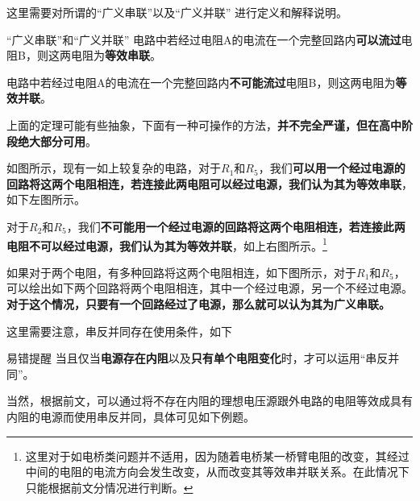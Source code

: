这里需要对所谓的“广义串联”以及“广义并联” 进行定义和解释说明。

\begin{defi}[label=gycbl]{“广义串联”和“广义并联”}{}
电路中若经过电阻A的电流在一个完整回路内\textbf{可以流过}电阻B，则这两电阻为\textbf{等效串联}。

电路中若经过电阻A的电流在一个完整回路内\textbf{不可能流过}电阻B，则这两电阻为\textbf{等效并联}。
\end{defi}

上面的定理可能有些抽象，下面有一种可操作的方法，\textbf{并不完全严谨，但在高中阶段绝大部分可用}。



如图所示，现有一如上较复杂的电路，对于$R_1$和$R_5$，我们\textbf{可以用一个经过电源的回路将这两个电阻相连，若连接此两电阻可以经过电源，我们认为其为等效串联}，如下左图所示。

\begin{minipage}[b]{0.45\linewidth}

\end{minipage}
\hfill
\begin{minipage}[b]{0.45\linewidth}

\end{minipage}

对于$R_2$和$R_5$，我们\textbf{不可能用一个经过电源的回路将这两个电阻相连，若连接此两电阻不可以经过电源，我们认为其为等效并联}，如上右图所示。\footnote{这里对于如电桥类问题并不适用，因为随着电桥某一桥臂电阻的改变，其经过中间的电阻的电流方向会发生改变，从而改变其等效串并联关系。在此情况下只能根据前文分情况进行判断。}

如果对于两个电阻，有多种回路将这两个电阻相连，如下图所示，对于$R_1$和$R_5$，可以绘出如下两个回路将两个电阻相连，其中一个经过电源，另一个不经过电源。\textbf{对于这个情况，只要有一个回路经过了电源，那么就可以认为其为广义串联。}



这里需要注意，串反并同存在使用条件，如下

\begin{mk}{易错提醒}{}
当且仅当\textbf{电源存在内阻}以及\textbf{只有单个电阻变化}时，才可以运用“串反并同”。
\end{mk}

当然，根据前文，可以通过将不存在内阻的理想电压源跟外电路的电阻等效成具有内阻的电源而使用串反并同，具体可见如下例题。

